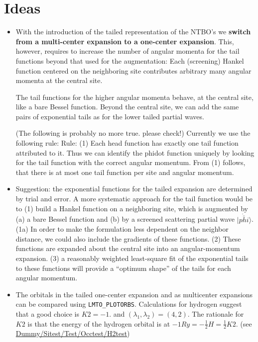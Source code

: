 \documentclass[11pt,a4paper]{report}
\begin{document}
\section{Ideas}
\begin{itemize}
\item With the introduction of the tailed representation of the NTBO's
  we \textbf{switch from a multi-center expansion to a one-center
    expansion}.  This, however, requires to increase the number of
  angular momenta for the tail functions beyond that used for the
  augmentation: Each (screening) Hankel function centered on the
  neighboring site contributes arbitrary many angular momenta at the
  central site.

  The tail functions for the higher angular momenta behave, at the
  central site, like a bare Bessel function. Beyond the central site,
  we can add the same pairs of exponential tails as for the lower
  tailed partial waves.

  (The following is probably no more true. please check!) Currently we
  use the following rule: Rule: (1) Each head function has exactly one
  tail function attributed to it.  Thus we can identify the phidot
  function uniquely by looking for the tail function with the correct
  angular momentum.  From (1) follows, that there is at most one tail
  function per site and angular momentum.
%
\item Suggestion: the exponential functions for the tailed expansion
  are determined by trial and error. A more systematic approach for
  the tail function would be to (1) build a Hankel function on a
  neighboring site, which is augmented by (a) a bare Bessel function
  and (b) by a screened scattering partial wave
  $|\dot{\bar{phi}}\rangle$. (1a) In order to make the formulation
  less dependent on the neighbor distance, we could also include the
  gradients of these functions. (2) These functions are expanded about
  the central site into an angular-momentum expansion.  (3) a
  reasonably weighted least-square fit of the exponential tails to
  these functions will provide a ``optimum shape'' of the tails for
  each angular momentum.
%
\item The orbitals in the tailed one-center expansion and as
  multicenter expansions can be compared using \verb|LMTO_PLOTORBS|.
  Calculations for hydrogen suggest that a good choice is $K2=-1.$ and
  $(\lambda_1,\lambda_2)=(4,2)$. The rationale for $K2$ is that the
  energy of the hydrogen orbital is at
  $-1Ry=-\frac{1}{2}H=\frac{1}{2}K2$. (see
  \url{Dummy/Sitest/Test/Occtest/H2test})
\end{itemize}
\end{document}
